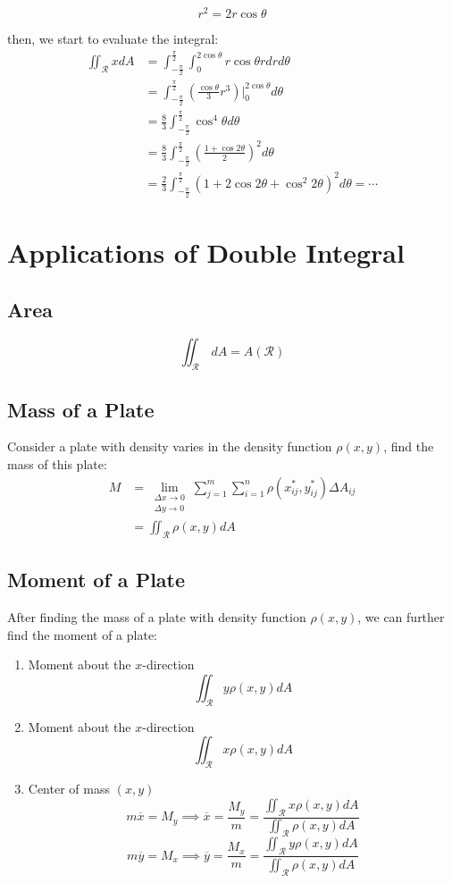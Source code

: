 \documentclass[UTF8,a4paper, 10pt, openany]{svmono}
\begin{document}
$$r^2=2r\cos \theta$$

then, we start to evaluate the integral:
\begin{align*}
\iint_{\mathcal{R}}xdA &= \int_{-\frac{\pi}{2}}^{\frac{\pi}{2}}\int_{0}^{2\cos \theta}r\cos \theta rdrd\theta \\
&= \int_{-\frac{\pi}{2}}^{\frac{\pi}{2}} \left(\frac{\cos \theta}{3}r^3\right)|_{0}^{2\cos \theta}d\theta \\
&= \frac{8}{3}\int_{-\frac{\pi}{2}}^{\frac{\pi}{2}}\cos^4\theta d\theta \\
&= \frac{8}{3}\int_{-\frac{\pi}{2}}^{\frac{\pi}{2}}\left(\frac{1+\cos 2\theta}{2}\right)^2d\theta \\
&= \frac{2}{3}\int_{-\frac{\pi}{2}}^{\frac{\pi}{2}}\left(1+2\cos 2\theta +\cos^2 2\theta \right)^2d\theta =\cdots
\end{align*}



\section{Applications of Double Integral}

\subsection{Area}
$$\iint_{\mathcal{R}}\,dA=A(\mathcal{R})$$

\subsection{Mass of a Plate}
Consider a plate with density varies in the density function $\rho (x,y)$, find the mass of this plate:
\begin{align*}
M &= \lim_{\substack{\Delta x\to 0 \\ \Delta y\to 0}}\sum_{j=1}^{m}\sum_{i=1}^{n}\rho (x_{ij}^*,y_{ij}^*)\Delta A_{ij}\\
&= \iint_{\mathcal{R}}\rho (x,y)dA
\end{align*}

\subsection{Moment of a Plate}
After finding the mass of a plate with density function $\rho (x,y)$, we can further find the moment of a plate:\\
\begin{enumerate}
\item Moment about the $x$-direction
$$\iint_{\mathcal{R}}y\rho (x,y)dA$$
\item Moment about the $x$-direction
$$\iint_{\mathcal{R}}x\rho (x,y)dA$$
\item Center of mass $(x,y)$
$$m\overline{x}=M_y \implies \overline{x}=\frac{M_y}{m}=\frac{\displaystyle\iint_{\mathcal{R}}x\rho (x,y)dA}{\displaystyle\iint_{\mathcal{R}}\rho (x,y)dA}$$
$$m\overline{y}=M_x \implies \overline{y}=\frac{M_x}{m}=\frac{\displaystyle\iint_{\mathcal{R}}y\rho (x,y)dA}{\displaystyle\iint_{\mathcal{R}}\rho (x,y)dA}$$
\end{enumerate}
\end{document}
